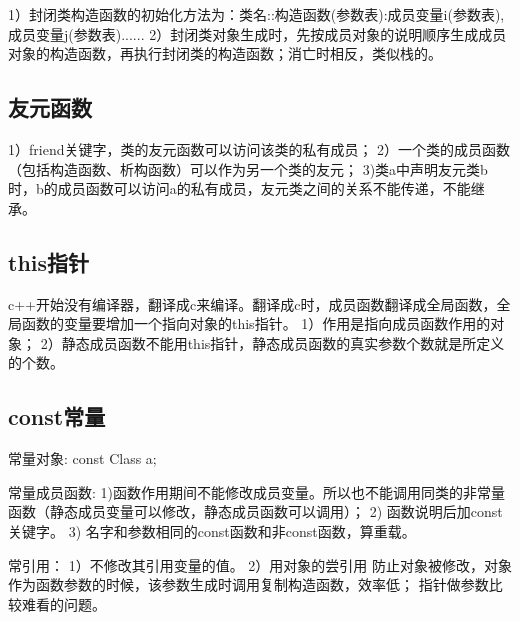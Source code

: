 \documentclass[UTF8]{article}
\begin{document}
1）封闭类构造函数的初始化方法为：类名::构造函数(参数表):成员变量i(参数表),成员变量j(参数表)...{...}
2）封闭类对象生成时，先按成员对象的说明顺序生成成员对象的构造函数，再执行封闭类的构造函数；消亡时相反，类似栈的。


\subsection{友元函数}
1）friend关键字，类的友元函数可以访问该类的私有成员；
2）一个类的成员函数（包括构造函数、析构函数）可以作为另一个类的友元；
3)类a中声明友元类b时，b的成员函数可以访问a的私有成员，友元类之间的关系不能传递，不能继承。


\subsection{this指针}
c++开始没有编译器，翻译成c来编译。翻译成c时，成员函数翻译成全局函数，全局函数的变量要增加一个指向对象的this指针。
1）作用是指向成员函数作用的对象；
2）静态成员函数不能用this指针，静态成员函数的真实参数个数就是所定义的个数。

\subsection{const常量}
常量对象: const Class a;


常量成员函数:
1)函数作用期间不能修改成员变量。所以也不能调用同类的非常量函数（静态成员变量可以修改，静态成员函数可以调用）；
2) 函数说明后加const关键字。
3) 名字和参数相同的const函数和非const函数，算重载。

常引用：
1）不修改其引用变量的值。
2）用对象的尝引用 %
防止对象被修改，对象作为函数参数的时候，该参数生成时调用复制构造函数，效率低； 指针做参数比较难看的问题。











\begin{comment}

\end{comment}
\end{document}
